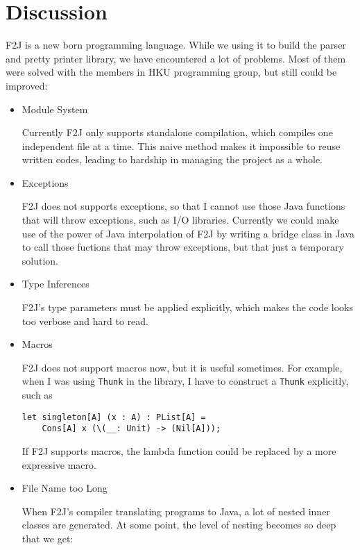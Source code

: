 \chapter{Discussion}

F2J is a new born programming language. While we using it to build the parser and pretty printer library, we have encountered a lot of problems. Most of them were solved with the members in HKU programming group, but still could be improved:

\begin{itemize}
\item Module System

Currently F2J only supports standalone compilation, which compiles one independent file at a time. This naive method makes it impossible to reuse written codes, leading to hardship in managing the project as a whole.

\item Exceptions

F2J does not supports exceptions, so that I cannot use those Java functions that will throw exceptions, such as I/O libraries. Currently we could make use of the power of Java interpolation of F2J by writing a bridge class in Java to call those fuctions that may throw exceptions, but that just a temporary solution.

\item Type Inferences

F2J's type parameters must be applied explicitly, which makes the code looks too verbose and hard to read.

\item Macros

F2J does not support macros now, but it is useful sometimes. For example, when I was using \texttt{Thunk} in the library, I have to construct a \texttt{Thunk} explicitly, such as

\begin{lstlisting}
let singleton[A] (x : A) : PList[A] =
    Cons[A] x (\(__: Unit) -> (Nil[A]));
\end{lstlisting}

If F2J supports macros, the lambda function could be replaced by a more expressive macro.

\item File Name too Long

When F2J's compiler translating programs to Java, a lot of nested inner classes are generated. At some point, the level of nesting becomes so deep that we get:


\end{itemize}
